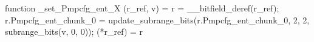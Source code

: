 function _set_Pmpcfg_ent_X (r_ref, v) = {
    r = __bitfield_deref(r_ref);
    r.Pmpcfg_ent_chunk_0 = update_subrange_bits(r.Pmpcfg_ent_chunk_0, 2, 2, subrange_bits(v, 0, 0));
    (*r_ref) = r
}
